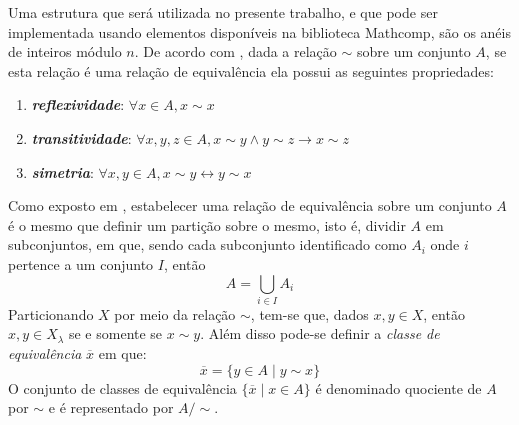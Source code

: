 Uma estrutura que será utilizada no presente trabalho, e que pode ser implementada usando elementos disponíveis na biblioteca Mathcomp, são os anéis de inteiros módulo $n$. De acordo com \cite[p.~40]{book:2399854}, dada a relação $\sim$ sobre um conjunto $A$, se esta relação é uma relação de equivalência ela possui as seguintes propriedades:
\begin{enumerate}
    \item \textbf{\textit{reflexividade}}: $\forall x \in A, x \sim x$
    \item \textbf{\textit{transitividade}}: $\forall x, y, z \in A, x \sim y \land y \sim z \rightarrow x \sim z$
    \item \textbf{\textit{simetria}}: $\forall x, y \in A, x \sim y \leftrightarrow y \sim x$
\end{enumerate}
Como exposto em \cite[p.~40-41]{book:2399854}, estabelecer uma relação de equivalência sobre um conjunto $A$ é o mesmo que definir um partição sobre o mesmo, isto é, dividir $A$ em subconjuntos, em que, sendo cada subconjunto identificado como $A_i$ onde $i$ pertence a um conjunto $I$, então
\begin{equation*}
    A = \bigcup_{i \in I} A_{i}
\end{equation*}
Particionando $X$ por meio da relação $\sim$, tem-se que, dados $x, y \in X$, então $x, y \in X_\lambda$ se e somente se $x \sim y$. Além disso pode-se definir a \textit{classe de equivalência} $\overline{x}$ em que:
\begin{equation*}
    \overline{x} = \{y \in A \mid y \sim x \}
\end{equation*}
O conjunto de classes de equivalência $\{\overline{x} \mid x \in A\}$ é denominado quociente de $A$ por $\sim$ e é representado por $A/\sim$.


